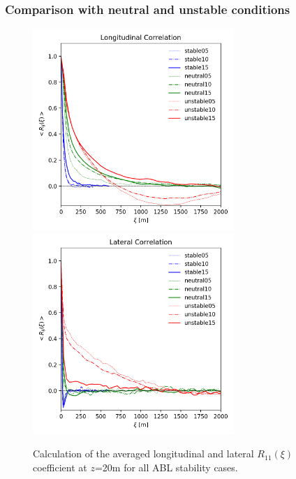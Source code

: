 \subsubsection{Comparison with neutral and unstable conditions}


\begin{figure}[hbt!]
  \label{fig:AllStabilityRij}
  \centering
  \includegraphics[width=3in]{figures/AllStability_Rij_Longitudinal.png}
  \includegraphics[width=3in]{figures/AllStability_Rij_Lateral.png}
  \caption{Calculation of the averaged longitudinal and lateral
    $R_{11}(\xi)$ coefficient at $z$=20m for all ABL stability cases.}
\end{figure}

